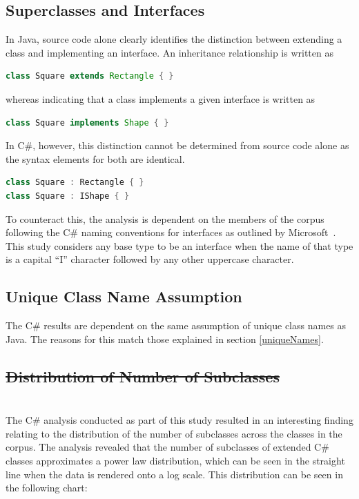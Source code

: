 \documentclass[11pt
              , a4paper
              , twoside
              , openright
              ]{report}
\providecommand{\DIFadd}[1]{{\protect\color{blue}\uwave{#1}}} %
\providecommand{\DIFdel}[1]{{\protect\color{red}\sout{#1}}}                      %
\providecommand{\DIFaddbegin}{} %
\providecommand{\DIFaddend}{} %
\providecommand{\DIFdelbegin}{} %
\providecommand{\DIFdelend}{} %
\begin{document}
\subsection{Superclasses and Interfaces}
\label{interfaceNaming}
In Java, source code alone clearly identifies the distinction between extending a class and implementing an interface. An inheritance relationship is written as
\begin{lstlisting}[language=java]
class Square extends Rectangle { }
\end{lstlisting}
whereas indicating that a class implements a given interface is written as
\begin{lstlisting}[language=java]
class Square implements Shape { }
\end{lstlisting}
In C\#, however, this distinction cannot be determined from source code alone as the syntax elements for both are identical.
\begin{lstlisting}[language=cs]
class Square : Rectangle { }
class Square : IShape { }
\end{lstlisting}
To counteract this, the analysis is dependent on the members of the corpus following the C\# naming conventions for interfaces as outlined by Microsoft~\cite{InterfaceNaming}. This study considers any base type to be an interface when the name of that type is a capital ``I'' character followed by any other uppercase character.

\subsection{Unique Class Name Assumption}
The C\# results are dependent on the same assumption of unique class names as Java. The reasons for this match those explained in section \ref{uniqueNames}.

\DIFdelbegin \subsection{\DIFdel{Distribution of Number of Subclasses}}
\addtocounter{subsection}{-1}%
\DIFdelend \DIFaddbegin \section{\DIFadd{Distribution of Number of Subclasses}}
\DIFaddend The C\# analysis conducted as part of this study resulted in an interesting finding relating to the distribution of the number of subclasses across the classes in the corpus. The analysis revealed that the number of subclasses of extended C\# classes approximates a power law distribution, which can be seen in the straight line when the data is rendered onto a log scale. This distribution can be seen in the following chart:
\end{document}
